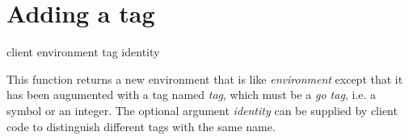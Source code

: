 \section{Adding a tag}

{\footnotesize
{} {client environment tag \optional identity}
}

This function returns a new environment that is like
\textit{environment} except that it has been augumented with a tag
named \textit{tag}, which must be a \emph{go tag}, i.e. a symbol or an
integer.  The optional argument \textit{identity} can be supplied by
client code to distinguish different tags with the same name.
